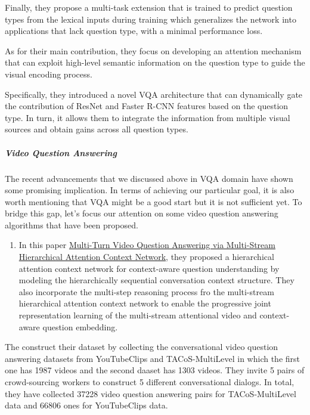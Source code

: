 \documentclass{acm_proc_article-sp}
\providecommand{\tightlist}{%
  \setlength{\itemsep}{0pt}\setlength{\parskip}{0pt}}
\begin{document}
Finally, they propose a multi-task extension that is trained to predict
question types from the lexical inputs during training which generalizes
the network into applications that lack question type, with a minimal
performance loss.

As for their main contribution, they focus on developing an attention
mechanism that can exploit high-level semantic information on the
question type to guide the visual encoding process.

Specifically, they introduced a novel VQA architecture that can
dynamically gate the contribution of ResNet and Faster R-CNN features
based on the question type. In turn, it allows them to integrate the
information from multiple visual sources and obtain gains across all
question types.

\subparagraph{Video Question Answering}\label{video-question-answering}

The recent advancements that we discussed above in VQA domain have shown
some promising implication. In terms of achieving our particular goal,
it is also worth mentioning that VQA might be a good start but it is not
sufficient yet. To bridge this gap, let's focus our attention on some
video question answering algorithms that have been proposed.

\begin{enumerate}
\def\labelenumi{\arabic{enumi}.}
\tightlist
\item
  In this paper
  \href{https://www.ijcai.org/proceedings/2018/0513.pdf}{Multi-Turn
  Video Question Answering via Multi-Stream Hierarchical Attention
  Context Network}, they proposed a hierarchical attention context
  network for context-aware question understanding by modeling the
  hierarchically sequential conversation context structure. They also
  incorporate the multi-step reasoning process fro the multi-stream
  hierarchical attention context network to enable the progressive joint
  representation learning of the multi-stream attentional video and
  context-aware question embedding.
\end{enumerate}

The construct their dataset by collecting the conversational video
question answering datasets from YouTubeClips and TACoS-MultiLevel in
which the first one has 1987 videos and the second daaset has 1303
videos. They invite 5 pairs of crowd-sourcing workers to construct 5
different conversational dialogs. In total, they have collected 37228
video question answering pairs for TACoS-MultiLevel data and 66806 ones
for YouTubeClips data.
\end{document}
